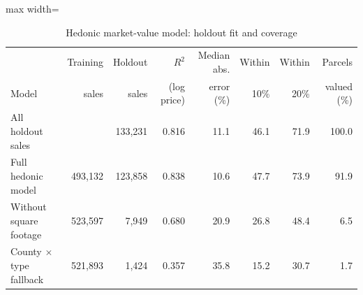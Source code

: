 \begin{table}[!ht]\centering
\caption{Hedonic market-value model: holdout fit and coverage}\label{tab:wedge_avm}
\begin{adjustbox}{max width=\textwidth}{\small\setlength{\tabcolsep}{4pt}
\begin{tabular}{lrrrrrrr}\toprule
 & Training & Holdout & $R^2$ & Median abs. & Within & Within & Parcels \\
Model & sales & sales & (log price) & error (\%) & 10\% & 20\% & valued (\%) \\\midrule
All holdout sales &  & 133,231 & 0.816 & 11.1 & 46.1 & 71.9 & 100.0 \\
Full hedonic model & 493,132 & 123,858 & 0.838 & 10.6 & 47.7 & 73.9 & 91.9 \\
Without square footage & 523,597 & 7,949 & 0.680 & 20.9 & 26.8 & 48.4 & 6.5 \\
County $\times$ type fallback & 521,893 & 1,424 & 0.357 & 35.8 & 15.2 & 30.7 & 1.7 \\
\bottomrule\end{tabular}}\end{adjustbox}
\begin{minipage}{0.96\textwidth}\end{minipage}\end{table}
